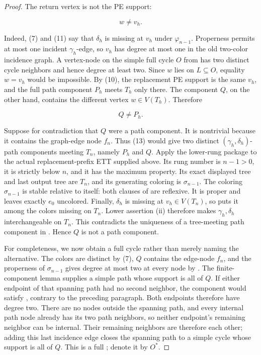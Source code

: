 \begin{proof}
The return vertex is not the PE support:

\[
                             w\ne v_h.                        \tag{12}
\]

Indeed, (7) and (11) say that \(\delta_h\) is missing at \(v_h\) under
\(\varphi_{n-1}\).  Properness permits at most one incident
\(\gamma_h\)-edge, so \(v_h\) has degree at most one in the old
two-color incidence graph.  A vertex-node on the simple full cycle \(O\)
from  has two distinct cycle neighbors and hence
degree at least two.  Since \(w\) lies on \(L\subseteq O\), equality
\(w=v_h\) would be impossible.  By (10), the replacement PE support is
the same \(v_h\), and the full path component \(P_h\) meets \(T_h\) only
there.  The component \(Q\), on the other hand, contains the different
vertex \(w\in V(T_h)\).  Therefore

\[
                              Q\ne P_h.                       \tag{13}
\]

Suppose for contradiction that \(Q\) were a path component.  It is
nontrivial because it contains the graph-edge node \(f_n\).  Thus (13)
would give two distinct \((\gamma_h,\delta_h)\)-path components meeting
\(T_n\), namely \(P_h\) and \(Q\).  Apply the lower-rung package to the
actual replacement-prefix ETT supplied above.  Its rung number is
\(n-1>0\), it is strictly below \(n\), and it has the maximum property.
Its exact displayed tree and last output tree are \(T_n\), and its
generating coloring is \(\sigma_{n-1}\).  The coloring
\(\sigma_{n-1}\) is stable relative to itself: both clauses of
 are reflexive.  It is proper and leaves exactly
\(e_0\) uncolored.  Finally, \(\delta_h\) is missing at
\(v_h\in V(T_n)\), so  puts it among the
colors missing on \(T_n\).  Lower assertion (ii) therefore makes
\(\gamma_h,\delta_h\) interchangeable on \(T_n\).  This contradicts
the uniqueness of a tree-meeting path component in
.  Hence \(Q\) is not a path component.

For completeness, we now obtain a full cycle rather than merely naming
the alternative.  The colors are distinct by (7), \(Q\) contains the
edge-node \(f_n\), and the properness of \(\sigma_{n-1}\) gives degree at
most two at every node by
.  The finite-component lemma
 supplies a simple path whose
support is all of \(Q\).  If either endpoint of that spanning path had no
second neighbor, the component would satisfy
, contrary to the preceding paragraph.
Both endpoints therefore have degree two.  There are no nodes outside the
spanning path, and every internal path node already has its two path
neighbors, so neither endpoint's remaining neighbor can be internal.
Their remaining neighbors are therefore each other; adding this last
incidence edge closes the spanning path to a simple cycle whose support is
all of \(Q\).  This is a full
; denote it by \(O^*\).


\end{proof}
